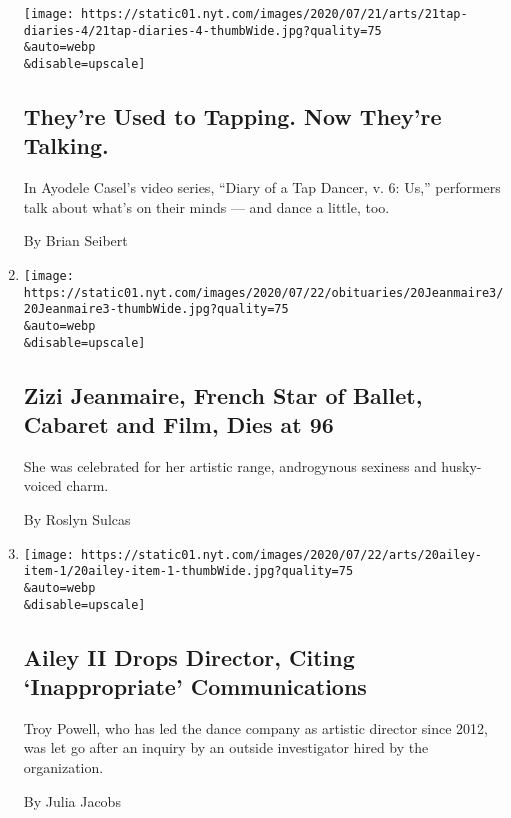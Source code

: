 \begin{enumerate}
  \texttt{[image: https://static01.nyt.com/images/2020/07/21/arts/21tap-diaries-4/21tap-diaries-4-thumbWide.jpg?quality=75\\\&auto=webp\\\&disable=upscale]}

  \hypertarget{theyre-used-to-tapping-now-theyre-talking}{%
  \subsection{They're Used to Tapping. Now They're
  Talking.}\label{theyre-used-to-tapping-now-theyre-talking}}

  In Ayodele Casel's video series, ``Diary of a Tap Dancer, v. 6: Us,''
  performers talk about what's on their minds --- and dance a little,
  too.

  By Brian Seibert
\item
  \href{/2020/07/21/arts/dance/zizi-jeanmaire-french-star-of-ballet-cabaret-and-film-dies-at-96.html}{}

  \texttt{[image: https://static01.nyt.com/images/2020/07/22/obituaries/20Jeanmaire3/20Jeanmaire3-thumbWide.jpg?quality=75\\\&auto=webp\\\&disable=upscale]}

  \hypertarget{zizi-jeanmaire-french-star-of-ballet-cabaret-and-film-dies-at-96}{%
  \subsection{Zizi Jeanmaire, French Star of Ballet, Cabaret and Film,
  Dies at
  96}\label{zizi-jeanmaire-french-star-of-ballet-cabaret-and-film-dies-at-96}}

  She was celebrated for her artistic range, androgynous sexiness and
  husky-voiced charm.

  By Roslyn Sulcas
\item
  \href{/2020/07/20/arts/dance/ailey-ii-troy-powell.html}{}

  \texttt{[image: https://static01.nyt.com/images/2020/07/22/arts/20ailey-item-1/20ailey-item-1-thumbWide.jpg?quality=75\\\&auto=webp\\\&disable=upscale]}

  \hypertarget{ailey-ii-drops-director-citing-inappropriate-communications}{%
  \subsection{Ailey II Drops Director, Citing `Inappropriate'
  Communications}\label{ailey-ii-drops-director-citing-inappropriate-communications}}

  Troy Powell, who has led the dance company as artistic director since
  2012, was let go after an inquiry by an outside investigator hired by
  the organization.

  By Julia Jacobs
\end{enumerate}

